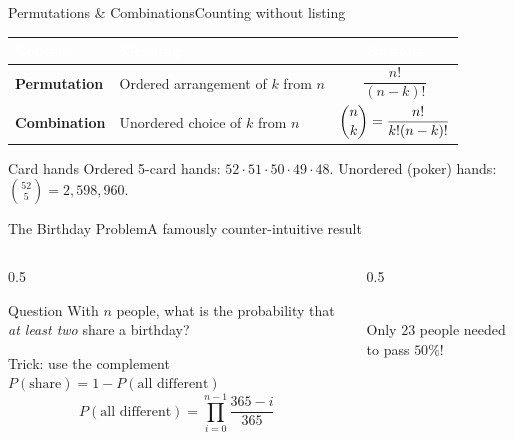 \documentclass[aspectratio=169,11pt]{beamer}
\begin{document}
\begin{frame}{Permutations \& Combinations}{Counting without listing}
  \small
  \renewcommand{\arraystretch}{1.35}
  \begin{center}
  \begin{tabularx}{\textwidth}{@{}>{\bfseries}l >{\raggedright\arraybackslash}X c@{}}
    \toprule
    \rowcolor{PrimaryDark}
    \textcolor{white}{Concept} & \textcolor{white}{Meaning} & \textcolor{white}{Formula} \\
    \midrule
    Permutation & Ordered arrangement of $k$ from $n$ & $\dfrac{n!}{(n-k)!}$ \\
    \rowcolor{PrimaryLight!25}
    Combination & Unordered choice of $k$ from $n$ & $\dbinom{n}{k}=\dfrac{n!}{k!(n-k)!}$ \\
    \bottomrule
  \end{tabularx}
  \end{center}
  \begin{exampleblock}{Card hands}
    \small Ordered 5-card hands: $52\cdot51\cdot50\cdot49\cdot48$. \quad
    Unordered (poker) hands: $\binom{52}{5} = 2{,}598{,}960$.
  \end{exampleblock}
\end{frame}

\begin{frame}{The Birthday Problem}{A famously counter-intuitive result}
  \begin{columns}[T]
    \begin{column}{0.5\textwidth}
      \begin{block}{Question}
        \small With $n$ people, what is the probability that \emph{at least
        two} share a birthday?
      \end{block}
      \begin{exampleblock}{Trick: use the complement}
        \small $P(\text{share}) = 1 - P(\text{all different})$
        \[ P(\text{all different}) = \prod_{i=0}^{n-1}\frac{365-i}{365} \]
      \end{exampleblock}
    \end{column}
    \begin{column}{0.5\textwidth}
      \centering
      \\
      \scriptsize Only $23$ people needed to pass $50\%$!
    \end{column}
  \end{columns}
\end{frame}
\end{document}
